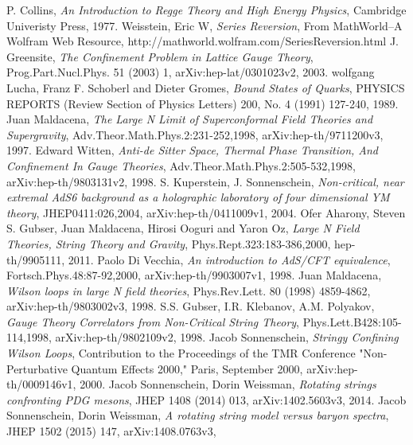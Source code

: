 \documentclass[11pt,a4paper]{article}
\begin{document}
\begin{thebibliography}{9}
	P. Collins,
	\emph{An Introduction to Regge Theory and High Energy Physics},
	Cambridge Univeristy
Press,
	1977.
	Weisstein, Eric W,
	\emph{Series Reversion},
	From MathWorld--A Wolfram Web Resource,
	http://mathworld.wolfram.com/SeriesReversion.html
	J. Greensite,
	\emph{The Confinement Problem in Lattice Gauge Theory},
	Prog.Part.Nucl.Phys. 51 (2003) 1,
	arXiv:hep-lat/0301023v2,
	2003.
	wolfgang Lucha, Franz F. Schoberl and Dieter Gromes,
	\emph{Bound States of Quarks},
	PHYSICS REPORTS (Review Section of Physics Letters) 200, No. 4 (1991) 127-240,
	1989.
	Juan Maldacena,
	\emph{The Large N Limit of Superconformal Field Theories and Supergravity},
	Adv.Theor.Math.Phys.2:231-252,1998,
	arXiv:hep-th/9711200v3,
	1997.
	Edward Witten,
	\emph{Anti-de Sitter Space, Thermal Phase Transition, And Confinement In Gauge Theories},
	Adv.Theor.Math.Phys.2:505-532,1998,
	arXiv:hep-th/9803131v2,
	1998.
	S. Kuperstein, J. Sonnenschein,
	\emph{Non-critical, near extremal AdS6 background as a holographic laboratory of four dimensional YM theory},
	JHEP0411:026,2004,
	arXiv:hep-th/0411009v1,
	2004.
	Ofer Aharony, Steven S. Gubser, Juan Maldacena, Hirosi Ooguri and Yaron Oz,
	\emph{Large N Field Theories, String Theory and Gravity},
	Phys.Rept.323:183-386,2000,
	hep-th/9905111,
	2011.
	Paolo Di Vecchia,
	\emph{An introduction to AdS/CFT equivalence},
	Fortsch.Phys.48:87-92,2000,
	arXiv:hep-th/9903007v1,
	1998.
	Juan Maldacena,
	\emph{Wilson loops in large N field theories},
	Phys.Rev.Lett. 80 (1998) 4859-4862,
	arXiv:hep-th/9803002v3,
	1998.
	S.S. Gubser, I.R. Klebanov, A.M. Polyakov,
	\emph{Gauge Theory Correlators from Non-Critical String Theory},
	Phys.Lett.B428:105-114,1998,
	arXiv:hep-th/9802109v2,
	1998.
	Jacob Sonnenschein,
	\emph{Stringy Confining Wilson Loops},
	Contribution to the Proceedings of the TMR Conference "Non-Perturbative Quantum Effects 2000," Paris, September 2000,
	arXiv:hep-th/0009146v1,
	2000.
	Jacob Sonnenschein, Dorin Weissman,
	\emph{Rotating strings confronting PDG mesons},
	JHEP 1408 (2014) 013,
	arXiv:1402.5603v3,
	2014.
	Jacob Sonnenschein, Dorin Weissman,
	\emph{A rotating string model versus baryon spectra},
	JHEP 1502 (2015) 147,
	arXiv:1408.0763v3,

\end{thebibliography}
\end{document}

